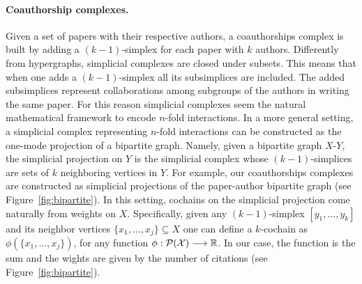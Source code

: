 \paragraph{Coauthorship complexes.}
Given a set of papers with their respective authors, a coauthorships complex is built by adding a $(k-1)$-simplex for each paper with $k$ authors. Differently from hypergraphs, simplicial complexes are closed under subsets. This means that when one adds a $(k-1)$-simplex all its subsimplices are included. The added subsimplices represent collaborations among subgroups of the authors in writing the same paper. For this reason simplicial complexes seem the natural mathematical framework to encode $n$-fold interactions. In a more general setting, a simplicial complex representing $n$-fold interactions can be constructed as the one-mode projection of a bipartite graph. Namely, given a bipartite graph $X$-$Y$, the simplicial projection on $Y$ is the simplicial complex whose $(k-1)$-simplices are sets of $k$ neighboring vertices in $Y$. For example, our coauthorships complexes are constructed as simplicial projections of the paper-author bipartite graph (see Figure~\ref{fig:bipartite}). In this setting, cochains on the simplicial projection come naturally from weights on $X$. Specifically, given any $(k-1)$-simplex $[y_1,\dots,y_k]$ and its neighbor vertices $\{x_1,\dots,x_j\}\subseteq X$ one can define a $k$-cochain as $\phi(\{x_1,\dots,x_j\})$, for any function $\phi: \mathcal{P(X)}\longrightarrow \mathbb{R} $. In our case, the function is the sum and the wights are given by the number of citations (see Figure~\ref{fig:bipartite}).
